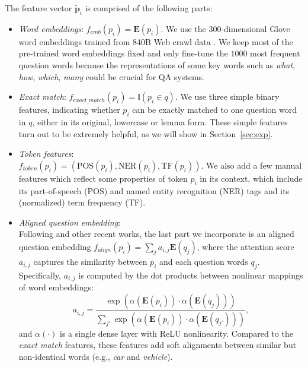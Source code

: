 \documentclass[11pt,a4paper]{article}
\begin{document}
The feature vector $\tilde{\mathbf{p}}_i$ is comprised of the following parts:
\begin{itemize}
    \item
    \emph{Word embeddings}: $f_{emb}(p_i) = \mathbf{E}(p_i)$. We use the 300-dimensional Glove word embeddings trained from 840B Web crawl data \cite{pennington2014glove}. We keep most of the pre-trained word embeddings fixed and only fine-tune the $1000$ most frequent question words because the representations of some key words such as \textit{what}, \textit{how}, \textit{which}, \textit{many} could be crucial for QA systems.
    \item
    \emph{Exact match}: $f_{exact\_match}(p_i) = \mathbb{I}(p_i \in q)$. We use three simple binary features, indicating whether $p_i$ can be exactly matched to one question word in $q$, either in its original, lowercase or lemma form. These simple features turn out to be extremely helpful, as we will show in Section~\ref{sec:exp}.
    \item
    \emph{Token features}: \\ $f_{token}(p_i) = (\text{POS}(p_i), \text{NER}(p_i), \text{TF}(p_i))$. We also add a few manual features which reflect some properties of token $p_i$ in its context, which include its part-of-speech (POS) and named entity recognition (NER) tags and its (normalized) term frequency (TF).
    \item
    \emph{Aligned question embedding}: \\ Following \cite{lee2016learning} and other recent works, the last part we incorporate is an aligned question embedding $f_{align}(p_i) = \sum_j{a_{i, j} \mathbf{E}(q_j)}$, where the attention score $a_{i, j}$ captures the similarity between $p_i$ and each question words $q_j$. Specifically, $a_{i, j}$ is computed by the dot products between nonlinear mappings of word embeddings: 
    \begin{equation*}
    	a_{i, j} = \frac{\exp\left(\alpha(\mathbf{E}(p_i)) \cdot \alpha(\mathbf{E}(q_{j}))\right)}{\sum_{j'}{\exp\left(\alpha(\mathbf{E}(p_i)) \cdot \alpha(\mathbf{E}(q_{j'}))\right)}},
    \end{equation*} and $\alpha(\cdot)$ is a single dense layer with ReLU nonlinearity. Compared to the \emph{exact match} features, these features add soft alignments between similar but non-identical words (e.g., \textit{car} and \textit{vehicle}).
\end{itemize}
\end{document}

